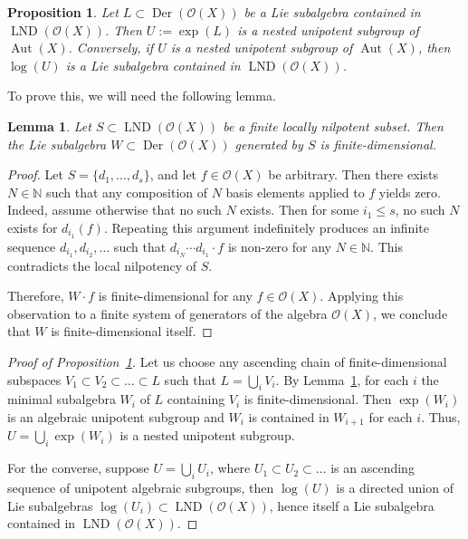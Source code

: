 \documentclass[12pt,a4paper]{amsart}
\theoremstyle{plain}
\newtheorem{lemma}[theorem]{Lemma}
\newtheorem{proposition}[theorem]{Proposition}
\theoremstyle{definition}
\theoremstyle{remark}
\def\Aut{\operatorname{Aut}}
\def\Der{\operatorname{Der}}
\def\LND{\operatorname{LND}}
\def\NN{{\mathbb N}}
\def\cO{{\mathcal O}}
\begin{document}
\begin{proposition}\label{pr:exp-nested}
   Let $L \subset \Der( \cO(X))$ be a Lie subalgebra contained in $\LND(\cO(X))$.
   Then $U:=\exp(L)$ is a nested unipotent subgroup of $\Aut(X)$. 
   Conversely, if $U$ is a nested unipotent subgroup of $\Aut(X)$, then $\log(U)$ is a Lie subalgebra contained in $\LND(\cO(X))$.
\end{proposition}
To prove this, we will need the following lemma.
\begin{lemma}\label{lm:locnilp-findim}
   Let $S\subset \LND(\cO(X))$ be a finite locally nilpotent subset.
   Then the Lie subalgebra $W\subset \Der(\cO(X))$ generated by $S$ is finite-dimensional.
\end{lemma}
\begin{proof}
Let $S=\{d_1, \ldots, d_s\}$, and let $f \in \cO(X)$ be arbitrary. 
Then there exists $N \in \mathbb{N}$ such that any composition of $N$ basis elements applied to $f$ yields zero. 
Indeed, assume otherwise that no such $N$ exists. 
Then for some $i_1\le s$, no such $N$ exists for $d_{i_1}(f)$. 
Repeating this argument indefinitely produces an infinite sequence $d_{i_1},d_{i_2}, \ldots$ such that $d_{i_N}\cdots d_{i_1}\cdot f$ is non-zero for any $N \in \NN$. This contradicts the local nilpotency of $S$.

Therefore, $W \cdot f$ is finite-dimensional for any $f \in \cO(X)$. Applying this observation to a finite system of generators of the algebra $\cO(X)$, we conclude that $W$ is finite-dimensional itself.   
\end{proof}
 
\begin{proof}[Proof of Proposition~\ref{pr:exp-nested}]
     Let us choose any ascending chain of finite-dimensional subspaces $V_1\subset V_2\subset\ldots\subset L$ such that $L=\bigcup_i V_i$.
    By Lemma~\ref{lm:locnilp-findim}, for each $i$ the minimal subalgebra $W_i$ of $L$ containing $V_i$ is finite-dimensional. 
    Then $\exp(W_i)$ is an algebraic unipotent subgroup and $W_i$ is contained in $W_{i+1}$ for each $i$. Thus, $U=\bigcup_i\exp(W_i)$ is a nested unipotent subgroup. 

    For the converse, suppose $U=\bigcup_i U_i$, where $U_1\subset U_2\subset\ldots$ is an ascending sequence of unipotent algebraic subgroups, then $\log(U)$ is a directed union of Lie subalgebras $\log(U_i)\subset\LND(\cO(X))$, hence itself a Lie subalgebra contained in $\LND(\cO(X))$.
\end{proof}  
\end{document}
